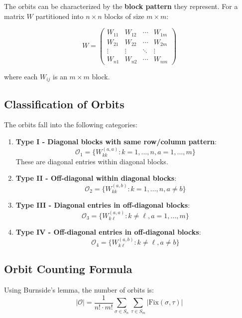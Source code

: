 \documentclass[11pt]{article}
\begin{document}
The orbits can be characterized by the \textbf{block pattern} they represent. For a matrix $W$ partitioned into $n \times n$ blocks of size $m \times m$:

\[
W = \begin{pmatrix}
W_{11} & W_{12} & \cdots & W_{1m} \\
W_{21} & W_{22} & \cdots & W_{2m} \\
\vdots & \vdots & \ddots & \vdots \\
W_{n1} & W_{n2} & \cdots & W_{nm}
\end{pmatrix}
\]

where each $W_{ij}$ is an $m \times m$ block.

\subsection{Classification of Orbits}

The orbits fall into the following categories:

\begin{enumerate}
    \item \textbf{Type I - Diagonal blocks with same row/column pattern}:
    \[
    \mathcal{O}_1 = \{W_{kk}^{(a,a)} : k = 1, \ldots, n, a = 1, \ldots, m\}
    \]
    These are diagonal entries within diagonal blocks.
    
    \item \textbf{Type II - Off-diagonal within diagonal blocks}:
    \[
    \mathcal{O}_2 = \{W_{kk}^{(a,b)} : k = 1, \ldots, n, a \neq b\}
    \]
    
    \item \textbf{Type III - Diagonal entries in off-diagonal blocks}:
    \[
    \mathcal{O}_3 = \{W_{k\ell}^{(a,a)} : k \neq \ell, a = 1, \ldots, m\}
    \]
    
    \item \textbf{Type IV - Off-diagonal entries in off-diagonal blocks}:
    \[
    \mathcal{O}_4 = \{W_{k\ell}^{(a,b)} : k \neq \ell, a \neq b\}
    \]
\end{enumerate}

\subsection{Orbit Counting Formula}

Using Burnside's lemma, the number of orbits is:
\[
|\mathcal{O}| = \frac{1}{n! \cdot m!} \sum_{\sigma \in S_n} \sum_{\tau \in S_m} |\text{Fix}(\sigma, \tau)|
\]
\end{document}
